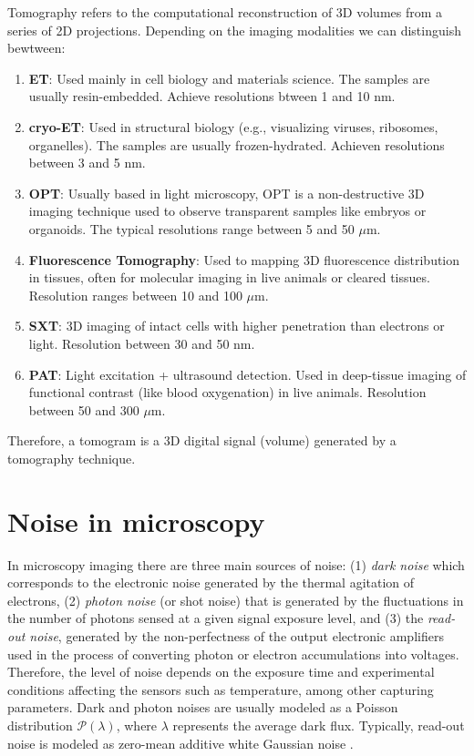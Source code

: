 Tomography refers to the computational reconstruction of 3D volumes
from a series of 2D projections. Depending on the imaging modalities
we can distinguish bewtween:
\begin{enumerate}
\item \textbf{\gls{ET}}: Used mainly in cell biology and materials
  science. The samples are usually resin-embedded. Achieve resolutions
  btween 1 and 10 nm.
\item \textbf{\gls{cryo-ET}}: Used in structural
  biology (e.g., visualizing viruses, ribosomes, organelles). The
  samples are usually frozen-hydrated. Achieven resolutions between 3
  and 5 nm.
\item \textbf{\gls{OPT}}: Usually based in
  light microscopy, OPT is a non-destructive 3D imaging technique used
  to observe transparent samples like embryos or organoids. The
  typical resolutions range between 5 and 50 $\mu$m.
\item \textbf{Fluorescence Tomography}: Used to mapping 3D
  fluorescence distribution in tissues, often for molecular imaging in
  live animals or cleared tissues. Resolution ranges between 10 and
  100 $\mu$m.
\item \textbf{\gls{SXT}}: 3D imaging of intact cells with
  higher penetration than electrons or light. Resolution between 30
  and 50 nm.
\item \textbf{\gls{PAT}}: Light excitation + ultrasound
  detection. Used in deep-tissue imaging of functional contrast (like
  blood oxygenation) in live animals. Resolution between 50 and 300
  $\mu$m.
\end{enumerate}

Therefore, a tomogram is a 3D digital signal (volume) generated by a
tomography technique.


\section{Noise in microscopy}

In microscopy imaging there are three main sources of noise: (1)
\emph{dark noise} which corresponds to the electronic noise generated
by the thermal agitation of electrons, (2) \emph{photon noise} (or
shot noise) that is generated by the fluctuations in the number of
photons sensed at a given signal exposure level, and (3) the
\emph{read-out noise}, generated by the non-perfectness of the output
electronic amplifiers used in the process of converting photon or
electron accumulations into voltages. Therefore, the level of noise
depends on the exposure time and experimental conditions affecting the
sensors such as temperature, among other capturing parameters. Dark
and photon noises are usually modeled as a Poisson distribution
$\mathcal{P}(\lambda)$, where $\lambda$ represents the average dark
flux. Typically, read-out noise is modeled as zero-mean additive white Gaussian
noise \cite{meiniel2018denoising,zhou2020wirtinger}.

